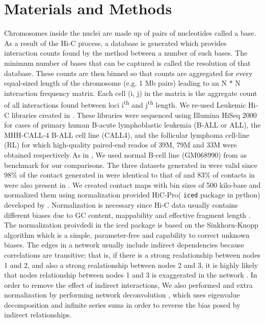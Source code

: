 \documentclass[a4,center,fleqn]{NAR}
\begin{document}
\section{Materials and Methods}
Chromosomes inside the nuclei are made up of
pairs of nucleotides called a base. As a result of
the Hi-C process, a database is generated which
provides interaction counts found by the method between
a number of such bases. The minimum number of
bases that can be captured is called the resolution of
that database. These counts are then binned so
that counts are aggregated for every equal-sized
length of the chromosome (e.g. 1 Mb pairs) leading
to an N * N interaction frequency matrix. Each
cell (i, j) in the matrix is the aggregate count
of all interactions found between loci i\textsuperscript{th} and
j\textsuperscript{th} length.
We re-used Leukemic Hi-C libraries created in
\cite{wang2013properties}. These libraries were sequenced
using Illumina HiSeq 2000 for cases of primary human
B-acute lymphoblastic leukemia (B-ALL or ALL),
the MHH-CALL-4 B-ALL cell line (CALL4), and the
follicular lymphoma cell-line (RL) for which high-quality
paired-end reados of 39M, 79M and 33M were obtained
respectively As in \cite{wang2013properties}, We used
normal B-cell line (GM068990) from as benchmark for
our comparisons. The three datasets generated in
\cite{wang2013properties} were valid since 98\% of
the contact generated in \cite{wang2013properties}
were identical to that of \cite{lieberman2009comprehensive}
and 83\% of contacts in \cite{lieberman2009comprehensive}
were also present in \cite{wang2013properties}. We
created contact maps with bin sizes of  500 kilo-base
and normalized them using normalization provided 
HiC-Pro( \texttt{iced} package in python) developed
by \cite{servant2015hic}.
Normalization is necessary since Hi-C data usually
contains different biases due to GC content,
mappability and effective fragment length \cite{yaffe2011probabilistic,
hu2012hicnorm}. The normalization proivdedi in
the iced package is based on the Sinkhorn-Knopp
algorithm which is a simple, parameter-free and
capability to correct unknown biases.  The edges
in a network usually include indirect dependencies because
correlations are transitive; that is, if there is
a strong realationship between nodes 1 and 2,
and also a strong realationship between nodes 2
and 3, it is highly likely that nodes relationship between
nodes 1 and 3 is exaggerated in the network \cite{feizi2013network}.
In order to remove the effect of indirect interactions,
We also performed and extra normalization by
performing network deconvolution \cite{feizi2013network},
which uses eigenvalue decomposition and infinite series
sums in order to reverse the bias posed by indirect
relationships.
\end{document}
